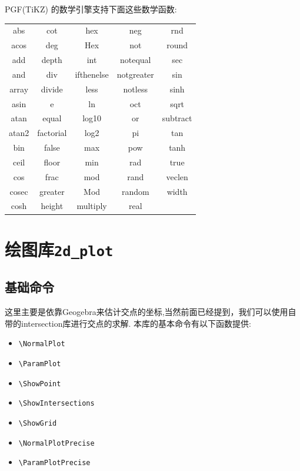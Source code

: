 \documentclass[12pt]{article}
\begin{document}
PGF(TiKZ) 的数学引擎支持下面这些数学函数:
\begin{center}
    \begin{tabular}{ccccc}
        \hline
        abs & cot & hex & neg & rnd \\
        acos & deg & Hex & not & round \\
        add & depth & int & notequal & sec \\
        and & div & ifthenelse & notgreater & sin \\
        array & divide & less & notless & sinh \\
        asin & e & ln & oct & sqrt \\
        atan & equal & log10 & or & subtract \\
        atan2 & factorial & log2 & pi & tan \\
        bin & false & max & pow & tanh \\
        ceil & floor & min & rad & true \\
        cos & frac & mod & rand & veclen \\
        cosec & greater & Mod & random & width \\
        cosh & height & multiply & real & \\
        \hline
    \end{tabular}            
\end{center}



\clearpage
\section{绘图库\texttt{2d\_plot}}
\subsection{基础命令}
这里主要是依靠Geogebra来估计交点的坐标,当然前面已经提到，我们可以使用自带的intersection库进行交点的求解.
本库的基本命令有以下函数提供:
\begin{itemize}
    \item \verb|\NormalPlot|
    \item \verb|\ParamPlot|
    \item \verb|\ShowPoint|
    \item \verb|\ShowIntersections|
    \item \verb|\ShowGrid|
    \item \verb|\NormalPlotPrecise|
    \item \verb|\ParamPlotPrecise|
\end{itemize}
\end{document}
